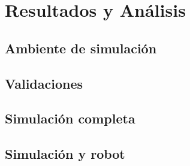 \chapter{Resultados y Análisis}\label{chapter:results}


\section{Ambiente de simulación}

\section{Validaciones}

\section{Simulación completa}

\section{Simulación y robot}
